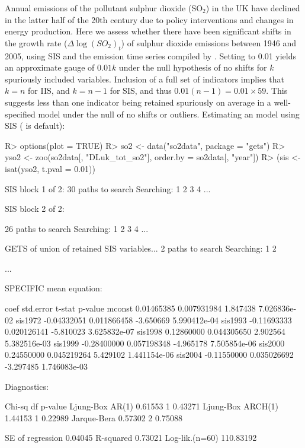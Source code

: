 \documentclass[article,nojss]{jss}
\begin{document}
Annual emissions of the pollutant sulphur dioxide (SO$_2$) in the UK
have declined in the latter half of the 20th century due to policy
interventions and changes in energy production. Here we assess whether
there have been significant shifts in the growth rate
($\Delta \log(SO_2)_t$) of sulphur dioxide emissions between 1946 and
2005, using SIS and the emission time series compiled by
\cite{smith2011anthropogenic}. Setting  to 0.01 yields an
approximate gauge of $0.01k$ under the null hypothesis of no shifts
for $k$ spuriously included variables. Inclusion of a full set of
indicators implies that $k=n$ for IIS, and $k=n-1$ for SIS, and thus
$0.01(n-1) = 0.01 \times 59$. This suggests less than one indicator
being retained spuriously on average in a well-specified model under
the null of no shifts or outliers. Estimating an  model
using SIS ( is default):
%
\begin{CodeChunk}
\begin{CodeInput}
R> options(plot = TRUE)
R> so2 <- data("so2data", package = "gets")  
R> yso2 <- zoo(so2data[, "DLuk_tot_so2"], order.by = so2data[, "year"])
R> (sis <- isat(yso2, t.pval = 0.01))
\end{CodeInput}
\begin{CodeOutput}
SIS block 1 of 2:
30 paths to search
Searching: 1 2 3 4 ...

SIS block 2 of 2:

26 paths to search
Searching: 1 2 3 4 ...

GETS of union of retained SIS variables... 
2 paths to search
Searching: 1 2 

...

SPECIFIC mean equation:

               coef   std.error    t-stat      p-value
mconst   0.01465385 0.007931984  1.847438 7.026836e-02
sis1972 -0.04332051 0.011866458 -3.650669 5.990412e-04
sis1993 -0.11693333 0.020126141 -5.810023 3.625832e-07
sis1998  0.12860000 0.044305650  2.902564 5.382516e-03
sis1999 -0.28400000 0.057198348 -4.965178 7.505854e-06
sis2000  0.24550000 0.045219264  5.429102 1.441154e-06
sis2004 -0.11550000 0.035026692 -3.297485 1.746083e-03

Diagnostics:

                   Chi-sq df p-value
Ljung-Box AR(1)   0.61553  1 0.43271
Ljung-Box ARCH(1) 1.44153  1 0.22989
Jarque-Bera       0.57302  2 0.75088
                          
SE of regression   0.04045
R-squared          0.73021
Log-lik.(n=60)   110.83192
\end{CodeOutput}
\end{CodeChunk}
\end{document}
